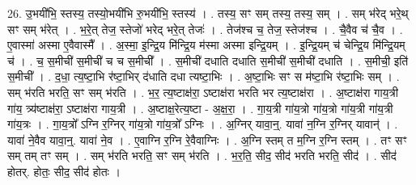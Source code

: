 \documentclass[17pt]{extarticle}
\begin{document}
26. उ॒भयी॑भि॒ स्तस्य॒ तस्यो॒भयी॑भि रु॒भयी॑भि॒ स्तस्य॑ । . तस्य॒ सꣳ सम् तस्य॒ तस्य॒ सम् । . सम् भ॑रेद् भरे॒थ् सꣳ सम् भ॑रेत् । . भ॒रे॒त् तेज॒ स्तेजो॑ भरेद् भरे॒त् तेजः॑ । . तेज॑श्च च॒ तेज॒ स्तेज॑श्च । . चै॒वैव च॑ चै॒व । . ए॒वास्मा॑ अस्मा ए॒वैवास्मै᳚ । . अ॒स्मा॒ इ॒न्द्रि॒य मि॑न्द्रि॒य म॑स्मा अस्मा इन्द्रि॒यम् । . इ॒न्द्रि॒यम् च॑ चेन्द्रि॒य मि॑न्द्रि॒यम् च॑ । . च॒ स॒मीची॑ स॒मीची॑ च च स॒मीची᳚ । . स॒मीची॑ दधाति दधाति स॒मीची॑ स॒मीची॑ दधाति । . स॒मीची॒ इति॑ स॒मीची᳚ । . द॒धा॒ त्य॒ष्टा॒भि र॑ष्टा॒भिर् द॑धाति दधा त्यष्टा॒भिः । . अ॒ष्टा॒भिः सꣳ स म॑ष्टा॒भि र॑ष्टा॒भिः सम् । . सम् भ॑रति भरति॒ सꣳ सम् भ॑रति । . भ॒र॒ त्य॒ष्टाक्ष॑रा॒ ऽष्टाक्ष॑रा भरति भर त्य॒ष्टाक्ष॑रा । . अ॒ष्टाक्ष॑रा गाय॒त्री गा॑य॒ त्र्य॑ष्टाक्ष॑रा॒ ऽष्टाक्ष॑रा गाय॒त्री । . अ॒ष्टाक्ष॒रेत्य॒ष्टा - अ॒क्ष॒रा॒ । . गा॒य॒त्री गा॑य॒त्रो गा॑य॒त्रो गा॑य॒त्री गा॑य॒त्री गा॑य॒त्रः । . गा॒य॒त्रो᳚ ऽग्नि र॒ग्निर् गा॑य॒त्रो गा॑य॒त्रो᳚ ऽग्निः । . अ॒ग्निर् यावा॒न्॒. यावा॑ न॒ग्नि र॒ग्निर् यावान्॑ । . यावा॑ ने॒वैव यावा॒न्॒. यावा॑ ने॒व । . ए॒वाग्नि र॒ग्नि रे॒वैवाग्निः । . अ॒ग्नि स्तम् त म॒ग्नि र॒ग्नि स्तम् । . तꣳ सꣳ सम् तम् तꣳ सम् । . सम् भ॑रति भरति॒ सꣳ सम् भ॑रति । . भ॒र॒ति॒ सीद॒ सीद॑ भरति भरति॒ सीद॑ । . सीद॑ होतर्. होतः॒ सीद॒ सीद॑ होतः । \newline
\end{document}

